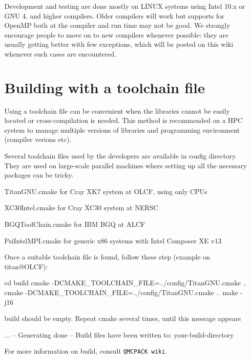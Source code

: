 Development and testing are done mostly on L\+I\+N\+U\+X systems using Intel 10.\+x or G\+N\+U 4. and higher compilers. Older compilers will work but supports for Open\+M\+P both at the compiler and run time may not be good. We strongly encourage people to move on to new compilers whenever possible\+: they are usually getting better with few exceptions, which will be posted on this wiki whenever such cases are encountered.\section{Building with a toolchain file}\label{a00004_toolbuild}
Using a toolchain file can be convenient when the libraries cannot be easily located or cross-\/compilation is needed. This method is recommended on a H\+P\+C system to manage multiple versions of libraries and programming environment (compiler verions etc).

Several toolchain files used by the developers are available in {\ttfamily config} directory. They are used on large-\/scale parallel machines where setting up all the necessary packages can be tricky.
\begin{DoxyItemize}
\item {\ttfamily Titan\+G\+N\+U.\+cmake} for Cray X\+K7 system at O\+L\+C\+F, using only C\+P\+Us
\item {\ttfamily X\+C30\+Intel.\+cmake} for Cray X\+C30 system at N\+E\+R\+S\+C
\item {\ttfamily B\+G\+Q\+Tool\+Chain.\+cmake} for I\+B\+M B\+G\+Q at A\+L\+C\+F
\item {\ttfamily Psi\+Intel\+M\+P\+I.\+cmake} for generic x86 systems with Intel Composer X\+E v13
\end{DoxyItemize}

Once a suitable toolchain file is found, follow these step (example on titan@O\+L\+C\+F)\+: 
\begin{DoxyCode}
cd build
cmake -DCMAKE\_TOOLCHAIN\_FILE=../config/TitanGNU.cmake ..
cmake -DCMAKE\_TOOLCHAIN\_FILE=../config/TitanGNU.cmake ..
make -j16
\end{DoxyCode}
 {\ttfamily build} should be empty. Repeat {\ttfamily cmake} several times, until this message appears 
\begin{DoxyCode}
...
-- Generating done
-- Build files have been written to: your-build-directory
\end{DoxyCode}


For more information on build, consult {\tt Q\+M\+C\+P\+A\+C\+K wiki}. 